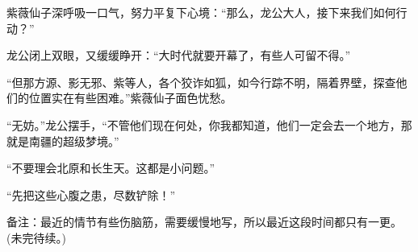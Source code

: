 \begin{this_body}
紫薇仙子深呼吸一口气，努力平复下心境：“那么，龙公大人，接下来我们如何行动？”

龙公闭上双眼，又缓缓睁开：“大时代就要开幕了，有些人可留不得。”

“但那方源、影无邪、紫等人，各个狡诈如狐，如今行踪不明，隔着界壁，探查他们的位置实在有些困难。”紫薇仙子面色忧愁。

“无妨。”龙公摆手，“不管他们现在何处，你我都知道，他们一定会去一个地方，那就是南疆的超级梦境。”

“不要理会北原和长生天。这都是小问题。”

“先把这些心腹之患，尽数铲除！”

备注：最近的情节有些伤脑筋，需要缓慢地写，所以最近这段时间都只有一更。(未完待续。)

\end{this_body}

